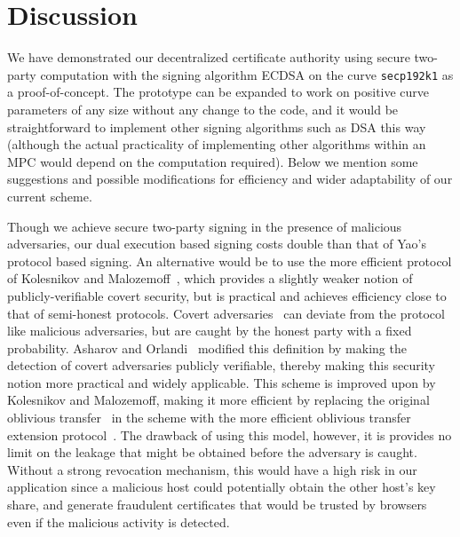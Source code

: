 \section{Discussion} \label{sec:discussion}

We have demonstrated our decentralized certificate authority using secure two-party computation with the signing algorithm ECDSA on the curve \texttt{secp192k1} as a proof-of-concept. The prototype can be expanded to work on positive curve parameters of any size without any change to the code, and it would be straightforward to implement other signing algorithms such as DSA this way (although the actual practicality of implementing other algorithms within an MPC would depend on the computation required). Below we mention some suggestions and possible modifications for efficiency and wider adaptability of our current scheme.

 Though we achieve secure two-party signing in the presence of malicious adversaries, our dual execution based signing costs double than that of Yao's protocol based signing. An alternative would be to use the more efficient protocol of Kolesnikov and Malozemoff~\cite{kolesnikov2014public}, which provides a slightly weaker notion of publicly-verifiable covert security, but is practical and achieves efficiency close to that of semi-honest protocols. Covert adversaries~\cite{aumann2007security} can deviate from the protocol like malicious adversaries, but are caught by the honest party with a fixed probability. Asharov and Orlandi~\cite{asharov2012calling} modified this definition by making the detection of covert adversaries publicly verifiable, thereby making this security notion more practical and widely applicable. This scheme is improved upon by Kolesnikov and Malozemoff, making it more efficient by replacing the original oblivious transfer~\cite{peikert2008framework} in the scheme with the more efficient oblivious transfer extension protocol~\cite{asharov2015more}. The drawback of using this model, however, it is provides no limit on the leakage that might be obtained before the adversary is caught. Without a strong revocation mechanism, this would have a high risk in our application since a malicious host could potentially obtain the other host's key share, and generate fraudulent certificates that would be trusted by browsers even if the malicious activity is detected.

